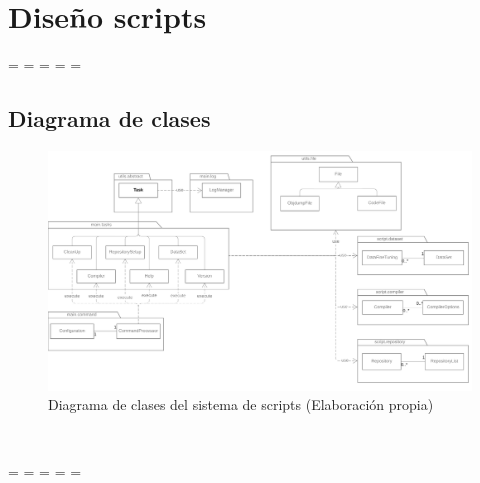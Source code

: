 \chapter{Diseño scripts}
\label{cap:diseño_scripts}


\newpage
\paperwidth=\pdfpageheight
\paperheight=\pdfpagewidth
\pdfpageheight=\paperheight
\pdfpagewidth=\paperwidth
\headwidth=\textheight

\section{Diagrama de clases}
\label{sec:diagrama_clases}

\begin{figure}[H]
    \begin{center}
        \includegraphics[scale=0.2]{figuras/Capitulo_XX/UML_Script.png}
    \end{center}
    \caption[Diagrama de clases del sistema de scripts]{Diagrama de clases del sistema de scripts (Elaboración propia)}
    \label{fig:UML_Script}
\end{figure}\

\newpage
\paperwidth=\pdfpageheight
\paperheight=\pdfpagewidth
\pdfpageheight=\paperheight
\pdfpagewidth=\paperwidth
\headwidth=\textwidth

